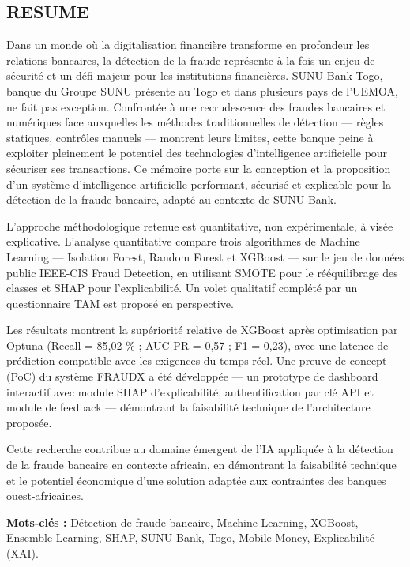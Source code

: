 \documentclass[
  12pt,
]{article}
\begin{document}
\subsection{RESUME}\label{resume}

Dans un monde où la digitalisation financière transforme en profondeur
les relations bancaires, la détection de la fraude représente à la fois
un enjeu de sécurité et un défi majeur pour les institutions
financières. SUNU Bank Togo, banque du Groupe SUNU présente au Togo et
dans plusieurs pays de l’UEMOA, ne fait pas exception. Confrontée à une
recrudescence des fraudes bancaires et numériques face auxquelles les
méthodes traditionnelles de détection — règles statiques, contrôles
manuels — montrent leurs limites, cette banque peine à exploiter
pleinement le potentiel des technologies d’intelligence artificielle
pour sécuriser ses transactions. Ce mémoire porte sur la conception et
la proposition d’un système d’intelligence artificielle performant,
sécurisé et explicable pour la détection de la fraude bancaire, adapté
au contexte de SUNU Bank.

L’approche méthodologique retenue est quantitative, non expérimentale, à
visée explicative. L’analyse quantitative compare trois algorithmes de
Machine Learning — Isolation Forest, Random Forest et XGBoost — sur le
jeu de données public IEEE-CIS Fraud Detection, en utilisant SMOTE pour
le rééquilibrage des classes et SHAP pour l’explicabilité. Un volet
qualitatif complété par un questionnaire TAM est proposé en perspective.

Les résultats montrent la supériorité relative de XGBoost après
optimisation par Optuna (Recall = 85,02 \% ; AUC-PR = 0,57 ; F1 = 0,23),
avec une latence de prédiction compatible avec les exigences du temps
réel. Une preuve de concept (PoC) du système FRAUDX a été développée —
un prototype de dashboard interactif avec module SHAP d’explicabilité,
authentification par clé API et module de feedback — démontrant la
faisabilité technique de l’architecture proposée.

Cette recherche contribue au domaine émergent de l’IA appliquée à la
détection de la fraude bancaire en contexte africain, en démontrant la
faisabilité technique et le potentiel économique d’une solution adaptée
aux contraintes des banques ouest-africaines.

\textbf{Mots-clés :} Détection de fraude bancaire, Machine Learning,
XGBoost, Ensemble Learning, SHAP, SUNU Bank, Togo, Mobile Money,
Explicabilité (XAI).
\end{document}
